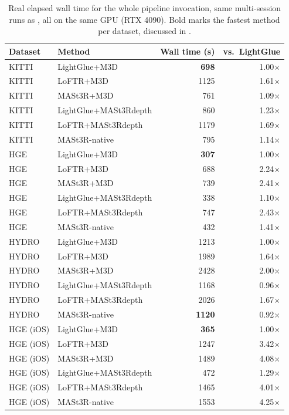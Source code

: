 \begin{table}[htb]
  \centering
  \footnotesize
  \begin{tabular*}{\textwidth}{@{\extracolsep{\fill}} llrr}
  \hline
  \textbf{Dataset} & \textbf{Method} & \textbf{Wall time (s)} & \textbf{vs.\ LightGlue} \\
  \hline
  KITTI & LightGlue+M3D & \textbf{698} & 1.00$\times$ \\
  KITTI & LoFTR+M3D & 1125 & 1.61$\times$ \\
  KITTI & MASt3R+M3D & 761 & 1.09$\times$ \\
  KITTI & LightGlue+MASt3Rdepth & 860 & 1.23$\times$ \\
  KITTI & LoFTR+MASt3Rdepth & 1179 & 1.69$\times$ \\
  KITTI & MASt3R-native & 795 & 1.14$\times$ \\
  \hline
  HGE & LightGlue+M3D & \textbf{307} & 1.00$\times$ \\
  HGE & LoFTR+M3D & 688 & 2.24$\times$ \\
  HGE & MASt3R+M3D & 739 & 2.41$\times$ \\
  HGE & LightGlue+MASt3Rdepth & 338 & 1.10$\times$ \\
  HGE & LoFTR+MASt3Rdepth & 747 & 2.43$\times$ \\
  HGE & MASt3R-native & 432 & 1.41$\times$ \\
  \hline
  HYDRO & LightGlue+M3D & 1213 & 1.00$\times$ \\
  HYDRO & LoFTR+M3D & 1989 & 1.64$\times$ \\
  HYDRO & MASt3R+M3D & 2428 & 2.00$\times$ \\
  HYDRO & LightGlue+MASt3Rdepth & 1168 & 0.96$\times$ \\
  HYDRO & LoFTR+MASt3Rdepth & 2026 & 1.67$\times$ \\
  HYDRO & MASt3R-native & \textbf{1120} & 0.92$\times$ \\
  \hline
  HGE (iOS) & LightGlue+M3D & \textbf{365} & 1.00$\times$ \\
  HGE (iOS) & LoFTR+M3D & 1247 & 3.42$\times$ \\
  HGE (iOS) & MASt3R+M3D & 1489 & 4.08$\times$ \\
  HGE (iOS) & LightGlue+MASt3Rdepth & 472 & 1.29$\times$ \\
  HGE (iOS) & LoFTR+MASt3Rdepth & 1465 & 4.01$\times$ \\
  HGE (iOS) & MASt3R-native & 1553 & 4.25$\times$ \\
  \hline
  \end{tabular*}
  \caption[PE-method full-pipeline wall time, all 6 methods]{Real elapsed wall time for the whole
    pipeline invocation, same multi-session runs as , all on the
    same GPU (RTX 4090). Bold marks the fastest method per dataset, discussed in
    .}
  \label{tab:ablation-pe-timing}
\end{table}

